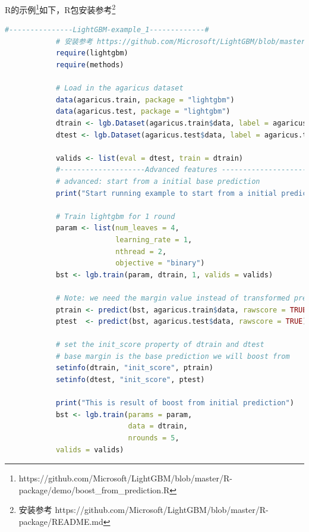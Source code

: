             R的示例\footnote{https://github.com/Microsoft/LightGBM/blob/master/R-package/demo/boost\_from\_prediction.R}如下，R包安装参考\footnote{安装参考 https://github.com/Microsoft/LightGBM/blob/master/R-package/README.md}
            \begin{lstlisting}[language = R]
            #---------------LightGBM-example_1-------------#
            # 安装参考 https://github.com/Microsoft/LightGBM/blob/master/R-package/README.md
            require(lightgbm)
            require(methods)

            # Load in the agaricus dataset
            data(agaricus.train, package = "lightgbm")
            data(agaricus.test, package = "lightgbm")
            dtrain <- lgb.Dataset(agaricus.train$data, label = agaricus.train$label)
            dtest <- lgb.Dataset(agaricus.test$data, label = agaricus.test$label)

            valids <- list(eval = dtest, train = dtrain)
            #--------------------Advanced features ---------------------------
            # advanced: start from a initial base prediction
            print("Start running example to start from a initial prediction")

            # Train lightgbm for 1 round
            param <- list(num_leaves = 4,
                          learning_rate = 1,
                          nthread = 2,
                          objective = "binary")
            bst <- lgb.train(param, dtrain, 1, valids = valids)

            # Note: we need the margin value instead of transformed prediction in set_init_score
            ptrain <- predict(bst, agaricus.train$data, rawscore = TRUE)
            ptest  <- predict(bst, agaricus.test$data, rawscore = TRUE)

            # set the init_score property of dtrain and dtest
            # base margin is the base prediction we will boost from
            setinfo(dtrain, "init_score", ptrain)
            setinfo(dtest, "init_score", ptest)

            print("This is result of boost from initial prediction")
            bst <- lgb.train(params = param,
                             data = dtrain,
                             nrounds = 5,
            valids = valids)
            \end{lstlisting}
% 
